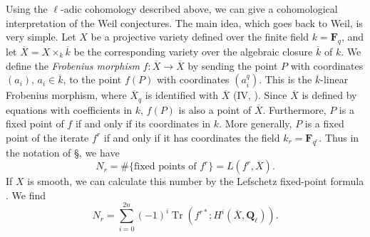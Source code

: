 {\par\medskip
{}\par\medskip
\noindent Using the $\ell$-adic cohomology described above, we can give a cohomological interpretation of the Weil conjectures. The main idea, which goes back to Weil, is very simple. Let $X$ be a projective variety defined over the finite field $k=\mathbf F_q$, and let $\overline X=X\times_k\overline k$ be the corresponding variety over the algebraic closure $\overline k$ of $k$. We define the \emph{Frobenius morphism} $f\colon\overline X\to\overline X$ by sending the point $P$ with coordinates $(a_i)$, $a_i\in\overline k$, to the point $f(P)$ with coordinates $(a_i^q)$. This is the $\overline k$-linear Frobenius morphism, where $\overline X_q$ is identified with $\overline X$ (IV, ). Since $\overline X$ is defined by equations with coefficients in $k$, $f(P)$ is also a point of $\overline X$. Furthermore, $P$ is a fixed point of $f$ if and only if its coordinates  in $k$. More generally, $P$ is a fixed point of the iterate $f^r$ if and only if it has coordinates  the field $k_r=\mathbf F_{q^r}$. Thus in the notation of \S{}, we have
\[
 N_r=\#\{\text{fixed points of }f^r\}=L(f^r,\overline X).
\]
If $X$ is smooth, we can calculate this number by the Lefschetz fixed-point formula .\EditionText{} We find
\[
 N_r=\sum_{i=0}^{2n}(-1)^i\operatorname{Tr}(f^{r*};H^i(\overline X,\mathbf Q_\ell)).
\]
}

